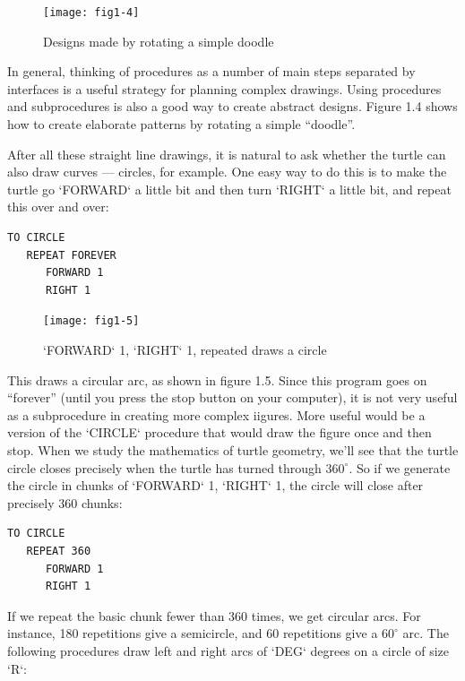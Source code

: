 \documentclass{book}
\begin{document}
\begin{figure}
\begin{center}
\texttt{[image: fig1-4]}
\caption{Designs made by rotating a simple doodle}
\end{center}
\end{figure}


In general, thinking of procedures as a number of main steps separated by interfaces is a useful strategy for planning complex drawings. Using procedures and subprocedures is also a good way to create abstract designs. Figure 1.4 shows how to create elaborate patterns by rotating a simple ``doodle''.

After all these straight line drawings, it is natural to ask whether the turtle can also draw curves --- circles, for example. One easy way to do this is to make the turtle go \textsc{`FORWARD`} a little bit and then turn \textsc{`RIGHT`} a little bit, and repeat this over and over:

\begin{verbatim}
TO CIRCLE
   REPEAT FOREVER
      FORWARD 1
      RIGHT 1
\end{verbatim}
\begin{figure}
\begin{center}
\texttt{[image: fig1-5]}
\caption{\textsc{`FORWARD`} 1, \textsc{`RIGHT`} 1, repeated draws a circle}
\end{center}
\end{figure}

This draws a circular arc, as shown in figure 1.5. Since this program
goes on ``forever'' (until you press the stop button on your computer), it
is not very useful as a subprocedure in creating more complex iigures.
More useful would be a version of the \textsc{`CIRCLE`} procedure that would
draw the figure once and then stop. When we study the mathematics of
turtle geometry, we'll see that the turtle circle closes precisely when the
turtle has turned through $360^{\circ}$. So if we generate the circle in chunks
of \textsc{`FORWARD`} 1, \textsc{`RIGHT`} 1, the circle will close after 
precisely 360 chunks:

\begin{verbatim}
TO CIRCLE
   REPEAT 360
      FORWARD 1
      RIGHT 1
\end{verbatim}
If we repeat the basic chunk fewer than 360 times, we get circular arcs.
For instance, 180 repetitions give a semicircle, and 60 repetitions give a
$60^{\circ}$ arc. The following procedures draw left and right arcs of \textsc{`DEG`} degrees
on a circle of size \textsc{`R`}:
\end{document}
